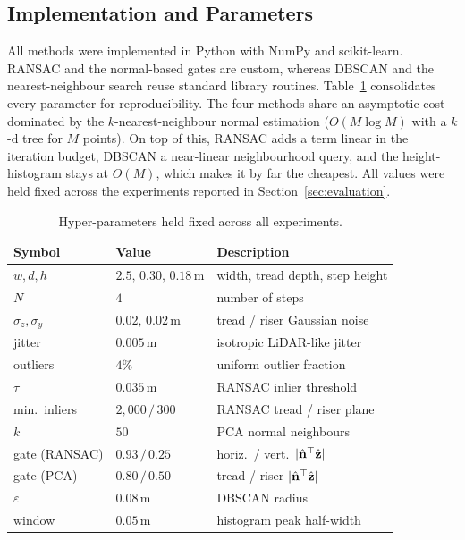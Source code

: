 \subsection{Implementation and Parameters}
All methods were implemented in Python with NumPy and scikit-learn. RANSAC and
the normal-based gates are custom, whereas DBSCAN and the nearest-neighbour
search reuse standard library routines. Table~\ref{tab:params} consolidates every
parameter for reproducibility. The four methods share an asymptotic cost
dominated by the $k$-nearest-neighbour normal estimation ($O(M\log M)$ with a
$k$-d tree for $M$ points). On top of this, RANSAC adds a term linear in the
iteration budget, DBSCAN a near-linear neighbourhood query, and the
height-histogram stays at $O(M)$, which makes it by far the cheapest. All values
were held fixed across the experiments reported in
Section~\ref{sec:evaluation}.

\begin{table}[t]
\caption{Hyper-parameters held fixed across all experiments.}
\label{tab:params}
\centering
\footnotesize
\begin{tabular}{lll}
\toprule
Symbol & Value & Description \\
\midrule
$w,d,h$ & $2.5,\,0.30,\,0.18$\,m & width, tread depth, step height \\
$N$ & $4$ & number of steps \\
$\sigma_z,\sigma_y$ & $0.02,\,0.02$\,m & tread / riser Gaussian noise \\
jitter & $0.005$\,m & isotropic LiDAR-like jitter \\
outliers & $4\%$ & uniform outlier fraction \\
$\tau$ & $0.035$\,m & RANSAC inlier threshold \\
min.\ inliers & $2{,}000\,/\,300$ & RANSAC tread / riser plane \\
$k$ & $50$ & PCA normal neighbours \\
gate (RANSAC) & $0.93\,/\,0.25$ & horiz.\ / vert.\ $|\hat{\mathbf{n}}^\top\hat{\mathbf{z}}|$ \\
gate (PCA) & $0.80\,/\,0.50$ & tread / riser $|\hat{\mathbf{n}}^\top\hat{\mathbf{z}}|$ \\
$\varepsilon$ & $0.08$\,m & DBSCAN radius \\
window & $0.05$\,m & histogram peak half-width \\
\bottomrule
\end{tabular}
\end{table}
